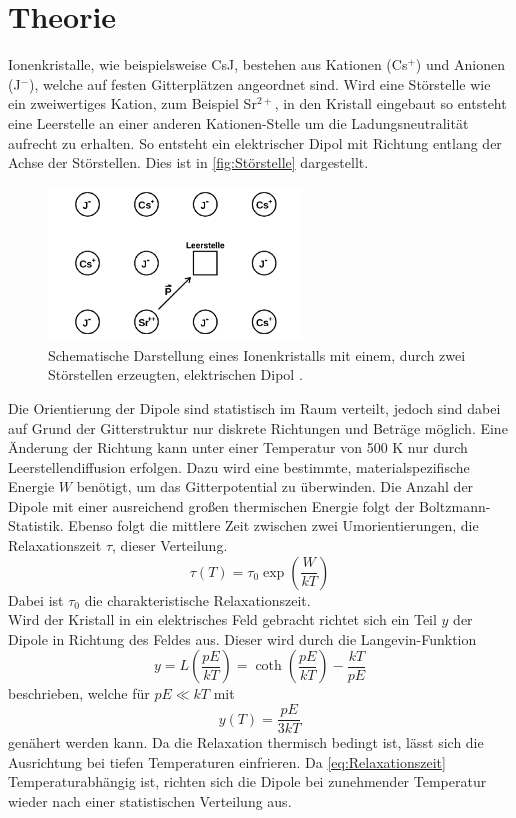 \section{Theorie}
\label{sec:Theorie}
Ionenkristalle, wie beispielsweise CsJ, bestehen aus Kationen (Cs$^{+}$) und Anionen (J$^{-}$), welche
auf festen Gitterplätzen angeordnet sind.
Wird eine Störstelle wie ein zweiwertiges Kation, zum Beispiel Sr$^{2+}$, in den Kristall eingebaut so
entsteht eine Leerstelle an einer anderen Kationen-Stelle um die Ladungsneutralität aufrecht zu erhalten.
So entsteht ein elektrischer Dipol mit Richtung entlang der Achse der Störstellen. Dies ist in \autoref{fig:Störstelle} dargestellt.
\begin{figure}[H]
  \centering
  \includegraphics[width=0.6\textwidth]{pics/Stoerstelle.png}
  \caption{Schematische Darstellung eines Ionenkristalls mit einem, durch
  zwei Störstellen erzeugten, elektrischen Dipol \cite{Anleitung}.}
  \label{fig:Störstelle}
\end{figure}
Die Orientierung der Dipole sind statistisch im Raum verteilt, jedoch sind dabei auf Grund der Gitterstruktur
nur diskrete Richtungen und Beträge möglich. Eine Änderung der Richtung
kann unter einer Temperatur von 500 K nur durch Leerstellendiffusion erfolgen.
Dazu wird eine bestimmte, materialspezifische Energie $W$ benötigt, um das Gitterpotential zu überwinden.
Die Anzahl der Dipole mit einer ausreichend großen thermischen Energie folgt der Boltzmann-Statistik.
Ebenso folgt die mittlere Zeit zwischen zwei Umorientierungen, die Relaxationszeit $\tau$, dieser Verteilung.
\begin{equation}
  \tau(T) = \tau_0 \exp{\left(\frac{W}{kT}\right)}
  \label{eq:Relaxationszeit}
\end{equation}
Dabei ist $\tau_0$ die charakteristische Relaxationszeit.\\
Wird der Kristall in ein elektrisches Feld gebracht richtet sich ein Teil $y$ der Dipole in Richtung
des Feldes aus. Dieser wird durch die Langevin-Funktion
\begin{equation}
  y = L\left( \frac{pE}{kT}\right) = \coth{\left( \frac{pE}{kT}\right) - \frac{kT}{pE}}
\end{equation}
beschrieben, welche für $pE \ll kT$ mit
\begin{equation}
  y(T)=\frac{pE}{3kT}
\end{equation}
genähert werden kann.
Da die Relaxation thermisch bedingt ist, lässt sich die Ausrichtung bei tiefen Temperaturen
einfrieren.
Da \autoref{eq:Relaxationszeit} Temperaturabhängig ist, richten sich die Dipole bei zunehmender Temperatur
wieder nach einer statistischen Verteilung aus.
